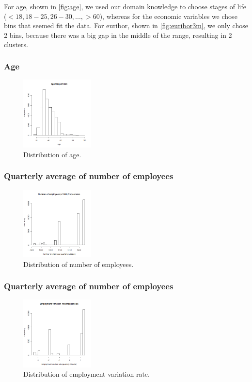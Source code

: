 \documentclass[11pt]{article}
\begin{document}
\begin{multicols}{2}
\medskip
For age, shown in \autoref{fig:age}, we used our domain knowledge to choose stages of life ($<18, 18-25, 26-30, ..., >60$), whereas for the economic variables we chose bins that seemed fit the data. For euribor, shown in \autoref{fig:euribor3m}, we only chose 2 bins, because there was a big gap in the middle of the range, resulting in 2 clusters.

\newpage
\subsubsection{Age}
\begin{figure}[H]
	\centering
	\includegraphics[width=0.33\textwidth]{images/age}
	\caption{Distribution of age.}
	\label{fig:age}
\end{figure}

\subsubsection{Quarterly average of number of employees}
\begin{figure}[H]
	\centering
	\includegraphics[width=0.33\textwidth]{images/nr_employed}
	\caption{Distribution of number of employees.}
	\label{fig:nr_employed}
\end{figure}

\subsubsection{Quarterly average of number of employees}
\begin{figure}[H]
	\centering
	\includegraphics[width=0.33\textwidth]{images/emp_var_rate}
	\caption{Distribution of employment variation rate.}
	\label{fig:emp_var_rate}
\end{figure}


\end{multicols}
\end{document}
